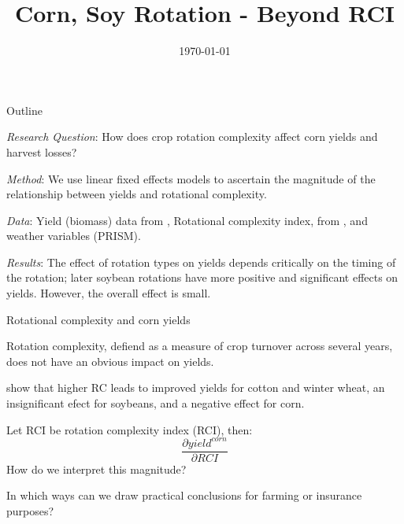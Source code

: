 \documentclass[notes,11pt, aspectratio=169]{beamer}
\date{\today}
\title[]{Corn, Soy Rotation - Beyond RCI}
\author[VEF]{}
\institute[UARK]{\small{\begin{tabular}{c c c}
			Lawson Connor && Victor Funes-Leal && Eunchun Park\\
			\multicolumn{3}{c}{\small Department of Agricultural Economics and Agribusiness}\\ 
			\multicolumn{3}{c}{\small University of Arkansas}\\
\end{tabular}}}
\newenvironment{wideitemize}{\itemize\addtolength{\itemsep}{10pt}}{\enditemize}
\begin{document}
 
\begin{frame}
	\maketitle
	\centering 
\end{frame}

\begin{frame}{Outline}
\begin{wideitemize}
    \item \emph{Research Question}: How does crop rotation complexity affect corn yields and harvest losses?
    \item \emph{Method}: We use linear fixed effects models to ascertain the magnitude of the relationship between yields and rotational complexity.
    \item \emph{Data}: Yield (biomass) data from \cite{lobell2015}, Rotational complexity index, from \cite{socolar2021}, and weather variables (PRISM).
    \item \emph{Results}: The effect of rotation types on yields depends critically on the timing of the rotation; later soybean rotations have more positive and significant effects on yields. However, the overall effect is small.
\end{wideitemize}
\end{frame}

\begin{frame}{Rotational complexity and corn yields}
    \begin{wideitemize}
        \item Rotation complexity, defiend as a measure of crop turnover across several years, does not have an obvious impact on yields.
        \item \cite{burchfield2024} show that higher RC leads to improved yields for cotton and winter wheat, an insignificant efect for soybeans, and a negative effect for corn.
        \item Let RCI be \cite{socolar2021} rotation complexity index (RCI), then:
        \begin{equation*}
            \dfrac{\partial yield^{corn}}{\partial RCI}
        \end{equation*}
        How do we interpret this magnitude?
        \item In which ways can we draw practical conclusions for farming or insurance purposes?
    \end{wideitemize}
\end{frame}
\end{document}
